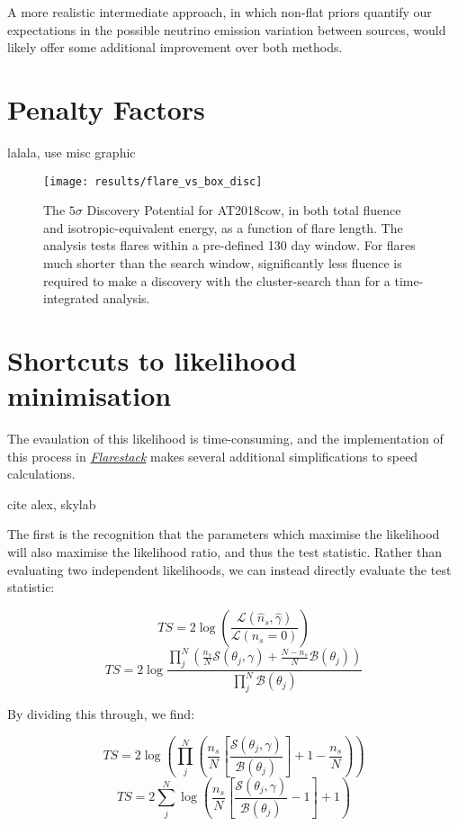 A more realistic intermediate approach, in which non-flat priors quantify our expectations in the possible neutrino emission variation between sources, would likely offer some additional improvement over both methods. 

\section{Penalty Factors}
lalala, use misc graphic

\begin{figure}[!ht]
	\centering \texttt{[image: results/flare\_vs\_box\_disc]}
	\caption{The $5\sigma$ Discovery Potential for AT2018cow, in both total fluence and isotropic-equivalent energy, as a function of flare length. The analysis tests flares within a pre-defined 130 day window. For flares much shorter than the search window, significantly less fluence is required to make a discovery with the cluster-search than for a time-integrated analysis.}
	\label{fig:DiscTime}
\end{figure}

\section{Shortcuts to likelihood minimisation}
The evaulation of this likelihood is time-consuming, and the implementation of this process in \emph{\href{https://github.com/IceCubeOpenSource/flarestack}{Flarestack}} makes several additional simplifications to speed calculations. 

cite alex, skylab

The first is the recognition that the parameters which maximise the likelihood will also maximise the likelihood ratio, and thus the test statistic. Rather than evaluating two independent likelihoods, we can instead directly evaluate the test statistic:

\begin{equation}
	TS = 2 \log \left( \frac{ \mathcal{L}(\hat{n}_{s}, \hat{\gamma}) }{\mathcal{L}(n_{s} = 0)} \right)
\end{equation}
\begin{equation}
TS = 2 \log  \frac{\prod_{j}^{N} \left(\frac{n_{s}}{N} \mathcal{S}(\theta_{j}, \gamma) + \frac{N - n_{s}}{N} \mathcal{B}(\theta_{j})  \right)}{\prod_{j}^{N}\mathcal{B}(\theta_{j})}
\end{equation}

By dividing this through, we find: 

\begin{equation}
	TS =  2 \log \left(  \prod_{j}^{N} \left(\frac{n_{s}}{N} \left[\frac{\mathcal{S}(\theta_{j}, \gamma)}{\mathcal{B}(\theta_{j})} \right] + 1 - \frac{n_{s}}{N} \right) \right) 
\end{equation}
\begin{equation}
	TS = 2 \sum_{j}^{N} \log \left(\frac{n_{s}}{N} \left[ \frac{\mathcal{S}(\theta_{j}, \gamma)}{\mathcal{B}(\theta_{j}) } - 1 \right] + 1 \right) 
\label{eq:TS_reduced}
\end{equation}

